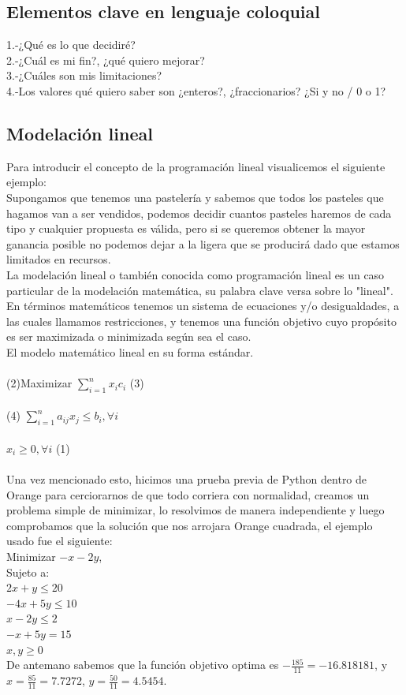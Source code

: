 \documentclass{article}
\begin{document}
\subsection*{Elementos clave en lenguaje coloquial}
1.-¿Qué es lo que decidiré? \\
2.-¿Cuál es mi fin?, ¿qué quiero mejorar? \\
3.-¿Cuáles son mis limitaciones? \\
4.-Los valores qué quiero saber son ¿enteros?, ¿fraccionarios? ¿Si  y no / 0 o 1? 
\subsection*{Modelación lineal}
Para introducir el concepto de la programación lineal visualicemos el siguiente ejemplo: \\
Supongamos que tenemos una pastelería y sabemos que todos los pasteles que hagamos van a ser vendidos, podemos decidir cuantos pasteles haremos de cada tipo y cualquier propuesta es válida, pero si se queremos obtener la mayor ganancia posible no podemos dejar a la ligera que se producirá dado que estamos limitados en recursos.\\
La modelación lineal o también conocida como programación lineal es un caso particular de la modelación matemática, su palabra clave versa sobre lo "lineal".\\  
En términos matemáticos tenemos un sistema de ecuaciones y/o desigualdades, a las cuales llamamos restricciones, y tenemos una función objetivo cuyo propósito es ser maximizada o minimizada según sea el caso. \\ 
El modelo matemático lineal en su forma estándar. \\ \\
(2)Maximizar  $\sum_{i=1}^{n}x_{i}c_{i} $ (3) \\ \\
(4) $\sum_{i=1}^{n}a_{ij}x_{j} \leq b_i, \forall i$  \\ \\
$ x_i \geq 0, \forall i$ (1) \\ \\ 
Una vez mencionado esto, hicimos una prueba previa de Python dentro de Orange para cerciorarnos de que todo corriera con normalidad, creamos un problema simple de minimizar, lo resolvimos de manera independiente y luego comprobamos que la solución que nos arrojara Orange cuadrada, el ejemplo usado fue el siguiente:\\ Minimizar $-x-2y$, \\
Sujeto a: \\
$2x+y \leq 20 $ \\
$-4x+5y \leq 10 $ \\
$x-2y \leq 2 $ \\
$-x+5y = 15 $ \\
$x,y \geq 0 $ \\
De antemano sabemos que la función objetivo optima es $- \frac{185}{11} = -16.818181$, y $x = \frac{85}{11} = 7.7272$, $y = \frac{50}{11} = 4.5454$.
\end{document}
